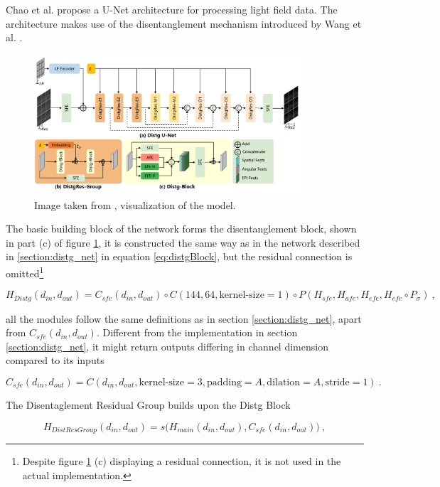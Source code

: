 Chao et al. \cite{chaoLFSRDiffLightField2025} propose a U-Net architecture for processing light field data.
The architecture makes use of the disentanglement mechanism introduced by Wang et al. \cite{wangDisentanglingLightFields2023}.

\begin{figure}[h!]
    \includegraphics[width=0.9\textwidth]{models/lfsr/imgs/unet.png}
    \caption{Image taken from \cite{chaoLFSRDiffLightField2025}, visualization of the model.}
    \label{fig:distg_unet}
\end{figure}

The basic building block of the network forms the disentanglement block, shown in part (c) of figure \ref{fig:distg_unet},
it is constructed the same way as in the network described in \ref{section:distg_net} in equation \ref{eq:distgBlock}, 
but the residual connection is omitted\footnote{Despite figure \ref{fig:distg_unet} (c) displaying a residual connection, it is not used in the actual implementation.}

    $$H_{Distg}(d_{in}, d_{out}) = C_{sfe}(d_{in}, d_{out}) \circ C(144, 64, \text{kernel-size}=1) \circ P(H_{sfe}, H_{afe}, H_{efe}, H_{efe} \circ P_\sigma) ~, $$

all the modules follow the same definitions as in section \ref{section:distg_net},
apart from $C_{sfe}(d_{in}, d_{out})$.
Different from the implementation in section \ref{section:distg_net},
it might return outputs differing in channel dimension compared to its inputs

    \begin{equation*}
        C_{sfe}(d_{in}, d_{out}) = C(d_{in}, d_{out}, \text{kernel-size}=3, \text{padding}=A, \text{dilation}=A, \text{stride}=1) ~.
    \end{equation*}

The Disentaglement Residual Group builds upon the Distg Block

    $$
        H_{DistResGroup}(d_{in}, d_{out}) = s \big( H_{main}(d_{in}, d_{out}), C_{sfe}(d_{in}, d_{out}) \big) ~,
    $$

